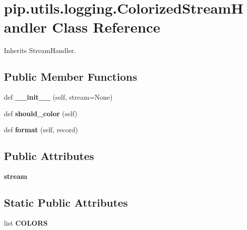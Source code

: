 \hypertarget{classpip_1_1utils_1_1logging_1_1_colorized_stream_handler}{}\section{pip.\+utils.\+logging.\+Colorized\+Stream\+Handler Class Reference}
\label{classpip_1_1utils_1_1logging_1_1_colorized_stream_handler}


Inherits Stream\+Handler.

\subsection*{Public Member Functions}
\begin{DoxyCompactItemize}
\item 
\mbox{\label{classpip_1_1utils_1_1logging_1_1_colorized_stream_handler_a3dabbb6191861ed26f5bbce5b50fe6cd}} 
def {\bfseries \+\_\+\+\_\+init\+\_\+\+\_\+} (self, stream=None)
\item 
\mbox{\label{classpip_1_1utils_1_1logging_1_1_colorized_stream_handler_acb33652e8022186c5810667d29d8ffec}} 
def {\bfseries should\+\_\+color} (self)
\item 
\mbox{\label{classpip_1_1utils_1_1logging_1_1_colorized_stream_handler_a0a68ac40661a9af4e0f51754b54f2294}} 
def {\bfseries format} (self, record)
\end{DoxyCompactItemize}
\subsection*{Public Attributes}
\begin{DoxyCompactItemize}
\item 
\mbox{\label{classpip_1_1utils_1_1logging_1_1_colorized_stream_handler_aed5cab3868d3cf00d40c63cb0b254aa6}} 
{\bfseries stream}
\end{DoxyCompactItemize}
\subsection*{Static Public Attributes}
\begin{DoxyCompactItemize}
\item 
list {\bfseries C\+O\+L\+O\+RS}
\end{DoxyCompactItemize}


